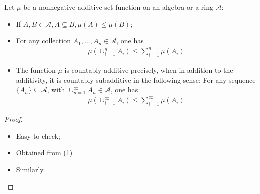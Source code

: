 \documentclass[Total.tex]{subfiles}
\begin{document}
			\begin{proposition}
				Let $\mu$ be a nonnegative additive set function on an algebra or a ring $\mathcal{A}$:
				
				\begin{itemize}
					\item If $A,B\in \mathcal{A},A\subseteq B,\mu(A)\leq \mu(B)$;
					\item For any collection $A_1,\dots,A_n\in \mathcal{A}$, one has
					\begin{gather*}
					\mu(\cup_{i=1}^n A_i)\leq \sum_{i=1}^n \mu(A_i)
					\end{gather*}
					\item The function $\mu$ is countably additive precisely, when in addition to the additivity, it is countably subadditive in the following sense: For any sequence $\{A_n\}\subseteq \mathcal{A}$, with $\cup_{n=1}^\infty A_n\in\mathcal{A}$, one has
					\begin{gather*}
						\mu(\cup_{i=1}^\infty A_i)\leq \sum_{i=1}^\infty \mu(A_i)
					\end{gather*}
				\end{itemize}
			\end{proposition}
			\begin{proof}
				\begin{itemize}
					\item Easy to check;
					\item Obtained from (1)
					\item Similarly. 
				\end{itemize}
			\end{proof}
			
			
				
\end{document}
